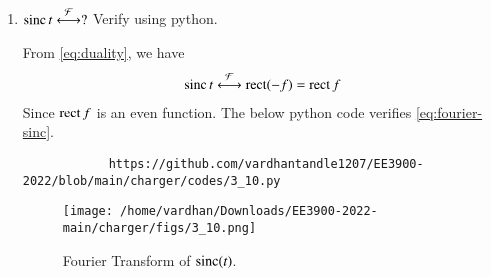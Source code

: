 \documentclass[journal,12pt,twocolumn]{IEEEtran}
\renewcommand\thesection{\arabic{section}}
\begin{document}
\begin{enumerate}[label=\thesection.\arabic*
		,ref=\thesection.\theenumi]
		\solution We write
		\begin{align}
			\rect{t}&\system{F}\int_{-\infty}^{\infty}\rect{t}e^{-\j2\pi ft}\, dt \\
			&=\int_{-\frac{1}{2}}^{\frac{1}{2}}e^{-\j2\pi ft}\, dt \\
			&=\frac{e^{\j\pi f} - e^{-\j\pi f}}{\j2\pi f} = \frac{\sin{\pi f}}{\pi f} = \sinc{f}
			\label{eq:fourier-rect}
		\end{align}
		The below python code verifies \eqref{eq:fourier-rect}.
		\begin{lstlisting}
			https://github.com/vardhantandle1207/EE3900-2022/blob/main/charger/codes/3_9.py
		\end{lstlisting}
		\begin{figure}[!ht]
			\texttt{[image: /home/vardhan/Downloads/EE3900-2022-main/charger/figs/3\_9.png]}
			\caption{Fourier Transform of $\rect(t)$.}
			\label{eq:fig-fourier-rect}
		\end{figure}
		\item $\mathop{\mathrm{sinc}}{t}\overset{\mathcal{F}}{ \longleftrightarrow} ?$  Verify using python.
		
		\solution From \eqref{eq:duality}, we have 
		\begin{align}
			\mathop{\mathrm{sinc}}{t}\overset{\mathcal{F}}{ \longleftrightarrow}\mathop{\mathrm{rect}}(-f)=\mathop{\mathrm{rect}}{f}
			\label{eq:fourier-sinc}
		\end{align}
		Since $\mathop{\mathrm{rect}}{f}$ is an even function.
		The below python code verifies \eqref{eq:fourier-sinc}.
		\begin{lstlisting}
			https://github.com/vardhantandle1207/EE3900-2022/blob/main/charger/codes/3_10.py
		\end{lstlisting}
		\begin{figure}[!ht]
			\texttt{[image: /home/vardhan/Downloads/EE3900-2022-main/charger/figs/3\_10.png]}
			\caption{Fourier Transform of $\mathop{\mathrm{sinc}}(t)$.}
			\label{eq:fig-fourier-sinc}
		\end{figure}
	\end{enumerate}
	
\end{document}

